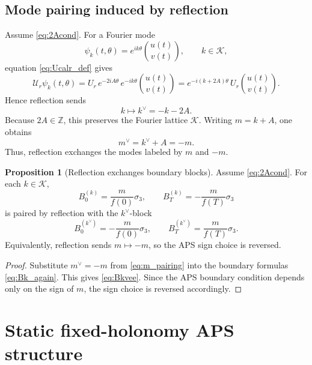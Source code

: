 \documentclass[11pt]{article}
\theoremstyle{definition}
\newtheorem{proposition}[theorem]{Proposition}
\numberwithin{equation}{section}
\begin{document}
\subsection{Mode pairing induced by reflection}\label{sec:Mode_paring_induced_reflection}

Assume \eqref{eq:2Acond}. For a Fourier mode
\begin{equation}
\psi_k(t,\theta)=e^{ik\theta}\binom{u(t)}{v(t)},
\qquad k\in\mathcal K,
\end{equation}
equation \eqref{eq:Ucalr_def} gives
\begin{equation}\label{eq:reflection_on_mode}
\mathcal U_r\psi_k(t,\theta)
=
U_r\,e^{-2iA\theta}\,e^{-ik\theta}\binom{u(t)}{v(t)}
=
e^{-i(k+2A)\theta}\,U_r\binom{u(t)}{v(t)}.
\end{equation}
Hence reflection sends
\begin{equation}\label{eq:kpair}
k\longmapsto k^\vee= -k-2A.
\end{equation}
Because \(2A\in\mathbb Z\), this preserves the Fourier lattice \(\mathcal K\). Writing \(m=k+A\), one obtains
\begin{equation}\label{eq:m_pairing}
m^\vee=k^\vee+A=-m.
\end{equation}
Thus, reflection exchanges the modes labeled by \(m\) and \(-m\).

\begin{proposition}[Reflection exchanges boundary blocks]
\label{prop:blockpair}
Assume \eqref{eq:2Acond}. For each \(k\in\mathcal K\),
\begin{equation}\label{eq:Bk_again}
B_0^{(k)}=\frac{m}{f(0)}\sigma_3,
\qquad
B_T^{(k)}=-\frac{m}{f(T)}\sigma_3
\end{equation}
is paired by reflection with the \(k^\vee\)-block
\begin{equation}\label{eq:Bkvee}
B_0^{(k^\vee)}=-\frac{m}{f(0)}\sigma_3,
\qquad
B_T^{(k^\vee)}=\frac{m}{f(T)}\sigma_3.
\end{equation}
Equivalently, reflection sends \(m\mapsto -m\), so the APS sign choice is reversed.
\end{proposition}

\begin{proof}
Substitute \(m^\vee=-m\) from \eqref{eq:m_pairing} into the boundary formulas
\eqref{eq:Bk_again}. This gives \eqref{eq:Bkvee}. Since the APS boundary condition depends
only on the sign of \(m\), the sign choice is reversed accordingly.
\end{proof}

\section{Static fixed-holonomy APS structure}
\label{sec:rigorousSF}
\end{document}

